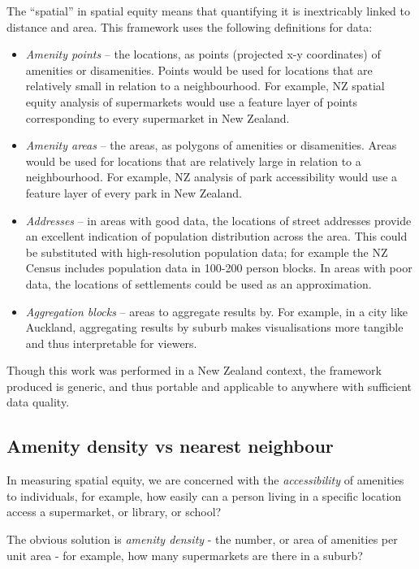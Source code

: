 \documentclass[12pt,a4paper]{article}
\begin{document}
The ``spatial'' in spatial equity means that quantifying it is inextricably linked to distance and area. This framework uses the following definitions for data:
\begin{itemize}
	\item \emph{Amenity points} -- the locations, as points (projected x-y coordinates) of amenities or disamenities. Points would be used for locations that are relatively small in relation to a neighbourhood. For example, NZ spatial equity analysis of supermarkets would use a feature layer of points corresponding to every supermarket in New Zealand.
	
	\item \emph{Amenity areas} -- the areas, as polygons of amenities or disamenities. Areas would be used for locations that are relatively large in relation to a neighbourhood. For example, NZ analysis of park accessibility would use a feature layer of every park in New Zealand.
	
	\item \emph{Addresses} -- in areas with good data, the locations of street addresses provide an excellent indication of population distribution across the area. This could be substituted with high-resolution population data; for example the NZ Census includes population data in 100-200 person blocks. In areas with poor data, the locations of settlements could be used as an approximation.
	
	\item \emph{Aggregation blocks} -- areas to aggregate results by. For example, in a city like Auckland, aggregating results by suburb makes visualisations more tangible and thus interpretable for viewers.
\end{itemize}

Though this work was performed in a New Zealand context, the framework produced is generic, and thus portable and applicable to anywhere with sufficient data quality.

\subsection{Amenity density vs nearest neighbour}

In measuring spatial equity, we are concerned with the \emph{accessibility} of amenities to individuals, for example, how easily can a person living in a specific location access a supermarket, or library, or school?

The obvious solution is \emph{amenity density} - the number, or area of amenities per unit area - for example, how many supermarkets are there in a suburb? 
\end{document}
